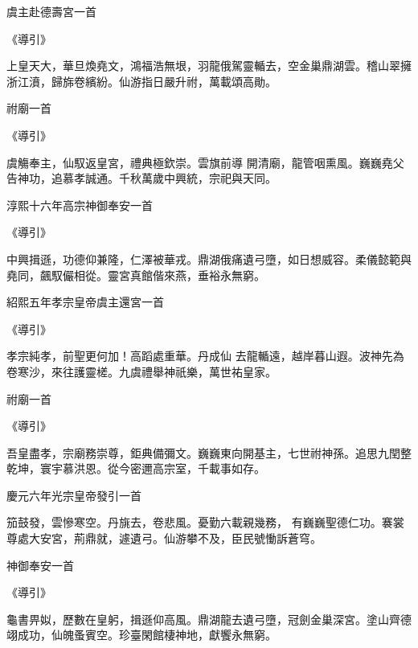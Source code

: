 \begin{pinyinscope}
 虞主赴德壽宮一首



 《導引》



 上皇天大，華旦煥堯文，鴻福浩無垠，羽龍俄駕靈輴去，空金巢鼎湖雲。稽山翠擁浙江濆，歸旆卷繽紛。仙游指日嚴升祔，萬載頌高勛。



 祔廟一首



 《導引》



 虞觴奉主，仙馭返皇宮，禮典極欽崇。雲旗前導
 開清廟，龍管咽熏風。巍巍堯父告神功，追慕孝誠通。千秋萬歲中興統，宗祀與天同。



 淳熙十六年高宗神御奉安一首



 《導引》



 中興揖遜，功德仰兼隆，仁澤被華戎。鼎湖俄痛遺弓墮，如日想威容。柔儀懿範與堯同，飆馭儼相從。靈宮真館偕來燕，垂裕永無窮。



 紹熙五年孝宗皇帝虞主還宮一首



 《導引》



 孝宗純孝，前聖更何加！高蹈處重華。丹成仙
 去龍輴遠，越岸暮山遐。波神先為卷寒沙，來往護靈槎。九虞禮舉神祇樂，萬世祐皇家。



 祔廟一首



 《導引》



 吾皇盡孝，宗廟務崇尊，鉅典備彌文。巍巍東向開基主，七世祔神孫。追思九閏整乾坤，寰宇慕洪恩。從今密邇高宗室，千載事如存。



 慶元六年光宗皇帝發引一首



 笳鼓發，雲慘寒空。丹旐去，卷悲風。憂勤六載親幾務，
 有巍巍聖德仁功。褰裳尊處大安宮，荊鼎就，遽遺弓。仙游攀不及，臣民號慟訴蒼穹。



 神御奉安一首



 《導引》



 龜書畀姒，歷數在皇躬，揖遜仰高風。鼎湖龍去遺弓墮，冠劍金巢深宮。塗山齊德翊成功，仙魄蚤賓空。珍臺閑館棲神地，獻饗永無窮。




\end{pinyinscope}
